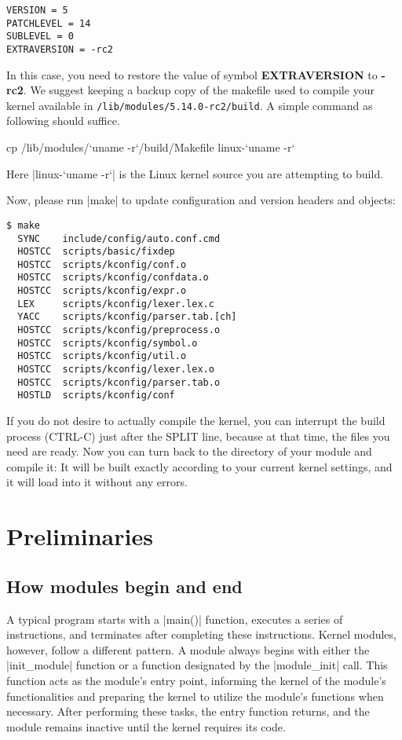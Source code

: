 \documentclass[10pt, oneside]{book}
\begin{document}
\begin{verbatim}
VERSION = 5
PATCHLEVEL = 14
SUBLEVEL = 0
EXTRAVERSION = -rc2
\end{verbatim}

In this case, you need to restore the value of symbol \textbf{EXTRAVERSION} to \textbf{-rc2}.
We suggest keeping a backup copy of the makefile used to compile your kernel available in \verb|/lib/modules/5.14.0-rc2/build|.
A simple command as following should suffice.
\begin{codebash}
cp /lib/modules/`uname -r`/build/Makefile linux-`uname -r`
\end{codebash}
Here \sh|linux-`uname -r`| is the Linux kernel source you are attempting to build.

Now, please run \sh|make| to update configuration and version headers and objects:

\begin{verbatim}
$ make
  SYNC    include/config/auto.conf.cmd
  HOSTCC  scripts/basic/fixdep
  HOSTCC  scripts/kconfig/conf.o
  HOSTCC  scripts/kconfig/confdata.o
  HOSTCC  scripts/kconfig/expr.o
  LEX     scripts/kconfig/lexer.lex.c
  YACC    scripts/kconfig/parser.tab.[ch]
  HOSTCC  scripts/kconfig/preprocess.o
  HOSTCC  scripts/kconfig/symbol.o
  HOSTCC  scripts/kconfig/util.o
  HOSTCC  scripts/kconfig/lexer.lex.o
  HOSTCC  scripts/kconfig/parser.tab.o
  HOSTLD  scripts/kconfig/conf
\end{verbatim}

If you do not desire to actually compile the kernel, you can interrupt the build process (CTRL-C) just after the SPLIT line, because at that time, the files you need are ready.
Now you can turn back to the directory of your module and compile it: It will be built exactly according to your current kernel settings, and it will load into it without any errors.

\section{Preliminaries}
\subsection{How modules begin and end}
\label{sec:module_init_exit}
A typical program starts with a \cpp|main()| function, executes a series of instructions,
and terminates after completing these instructions.
Kernel modules, however, follow a different pattern.
A module always begins with either the \cpp|init_module| function or a function designated by the \cpp|module_init| call.
This function acts as the module's entry point,
informing the kernel of the module's functionalities and preparing the kernel to utilize the module's functions when necessary.
After performing these tasks, the entry function returns, and the module remains inactive until the kernel requires its code.
\end{document}
